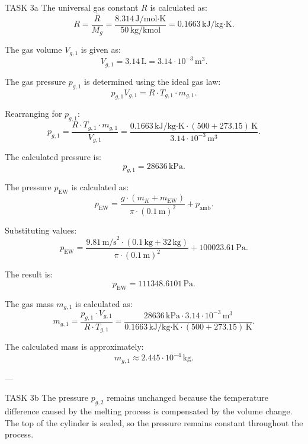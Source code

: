 TASK 3a  
The universal gas constant \( R \) is calculated as:  
\[
R = \frac{\bar{R}}{M_g} = \frac{8.314 \, \text{J/mol·K}}{50 \, \text{kg/kmol}} = 0.1663 \, \text{kJ/kg·K}.
\]

The gas volume \( V_{g,1} \) is given as:  
\[
V_{g,1} = 3.14 \, \text{L} = 3.14 \cdot 10^{-3} \, \text{m}^3.
\]

The gas pressure \( p_{g,1} \) is determined using the ideal gas law:  
\[
p_{g,1} V_{g,1} = R \cdot T_{g,1} \cdot m_{g,1}.
\]

Rearranging for \( p_{g,1} \):  
\[
p_{g,1} = \frac{R \cdot T_{g,1} \cdot m_{g,1}}{V_{g,1}} = \frac{0.1663 \, \text{kJ/kg·K} \cdot (500 + 273.15) \, \text{K}}{3.14 \cdot 10^{-3} \, \text{m}^3}.
\]

The calculated pressure is:  
\[
p_{g,1} = 28636 \, \text{kPa}.
\]

The pressure \( p_{\text{EW}} \) is calculated as:  
\[
p_{\text{EW}} = \frac{g \cdot (m_K + m_{\text{EW}})}{\pi \cdot (0.1 \, \text{m})^2} + p_{\text{amb}}.
\]

Substituting values:  
\[
p_{\text{EW}} = \frac{9.81 \, \text{m/s}^2 \cdot (0.1 \, \text{kg} + 32 \, \text{kg})}{\pi \cdot (0.1 \, \text{m})^2} + 100023.61 \, \text{Pa}.
\]

The result is:  
\[
p_{\text{EW}} = 111348.6101 \, \text{Pa}.
\]

The gas mass \( m_{g,1} \) is calculated as:  
\[
m_{g,1} = \frac{p_{g,1} \cdot V_{g,1}}{R \cdot T_{g,1}} = \frac{28636 \, \text{kPa} \cdot 3.14 \cdot 10^{-3} \, \text{m}^3}{0.1663 \, \text{kJ/kg·K} \cdot (500 + 273.15) \, \text{K}}.
\]

The calculated mass is approximately:  
\[
m_{g,1} \approx 2.445 \cdot 10^{-4} \, \text{kg}.
\]

---

TASK 3b  
The pressure \( p_{g,2} \) remains unchanged because the temperature difference caused by the melting process is compensated by the volume change. The top of the cylinder is sealed, so the pressure remains constant throughout the process.